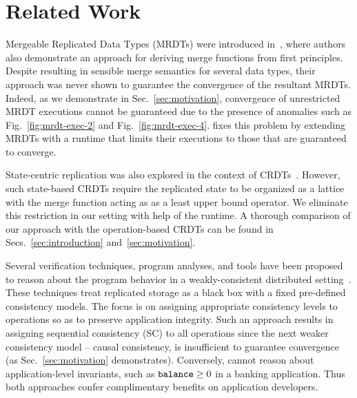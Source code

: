 \section{Related Work}
\label{sec:related}

Mergeable Replicated Data Types (MRDTs) were introduced
in~\cite{mrdt}, where authors also demonstrate an approach for
deriving merge functions from first principles.  Despite resulting in
sensible merge semantics for several data types, their approach was
never shown to guarantee the convergence of the resultant MRDTs.
Indeed, as we demonstrate in Sec.~\ref{sec:motivation}, convergence
of unrestricted MRDT executions cannot be guaranteed due to the
presence of anomalies such as Fig.~\ref{fig:mrdt-exec-2} and
Fig.~\ref{fig:mrdt-exec-4}. \quark fixes this problem by extending
MRDTs with a runtime that limits their executions to those that are
guaranteed to converge.


State-centric replication was also explored in the context of
CRDTs~\cite{crdts}. However, such state-based CRDTs require the
replicated state to be organized as a lattice with the merge function
acting as as a least upper bound operator. We eliminate this
restriction in our setting with help of the \quark runtime. A thorough
comparison of our approach with the operation-based CRDTs can be found
in Secs.~\ref{sec:introduction} and~\ref{sec:motivation}.

Several verification techniques, program analyses, and tools have been
proposed to reason about the program behavior in a weakly-consistent
distributed setting~\cite{bailis-vldb, alvaro-calm,
gotsman-popl16,redblue-atc, redblue-osdi, ecinec}. These techniques
treat replicated storage as a black box with a fixed pre-defined
consistency models. The focus is on assigning appropriate consistency
levels to operations so as to preserve application integrity. Such an
approach results in assigning sequential consistency (SC) to all
operations since the next weaker consistency model -- causal
consistency, is insufficient to guarantee convergence (as
Sec.~\ref{sec:motivation} demonstrates). Conversely, \quark cannot
reason about application-level invariants, such as ${\tt balance}\ge 0$
in a banking application. Thus both approaches confer complimentary
benefits on application developers.

